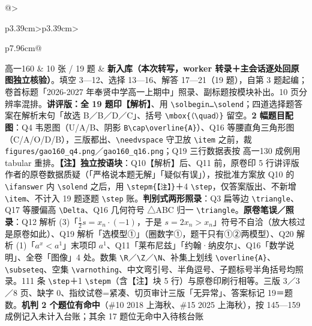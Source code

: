\documentclass[a4paper,11pt]{article}
\begin{document}
\begin{xltabular}{\textwidth}{@{}>{\raggedright\arraybackslash}p{3.39cm}>{\centering\arraybackslash}p{3.39cm}>{\raggedright\arraybackslash}p{7.96cm}@{}}
高一160 & 10 张 / 19 题 & \textbf{新入库（本次转写，worker 转录＋主会话逐处回原图独立核验）}。填空 3---12、选择 13---16、解答 17---21（19 题），自第 3 题起编；卷首标题「2026-2027 年奉贤中学高一上期中」照录、副标题按模块补出。10 页分辨率混排。\textbf{讲评版：全 19 题印【解析】}、用 \texttt{\textbackslash{}solbegin…\textbackslash{}solend}；四道选择题答案在解析末句「故选 B／B／D／C」、括号 \texttt{\textbackslash{}mbox\{（\textbackslash{}quad）\}} 留空。\textbf{2 幅题目配图}：Q4 韦恩图（U/A/B、阴影 \texttt{B\textbackslash{}cap\textbackslash{}overline\{A\}}）、Q16 等腰直角三角形图（C/A/O/D/B），三版都出、\texttt{\textbackslash{}needvspace} 守卫放 \texttt{\textbackslash{}item} 之前，裁 \texttt{figures/\allowbreak{}gao160\_q4.png}／\texttt{gao160\_q16.png}；Q19 三行数据表按 高一130 成例用 tabular 重排。\textbf{【注】独立按语块}：Q10【解析】后、Q11 前，原卷印 5 行讲评版作者的原卷数据质疑（「严格说本题无解」「疑似有误」），按批准方案放 Q10 的 \texttt{\textbackslash{}ifanswer} 内 \texttt{\textbackslash{}solend} 之后，用 \texttt{\textbackslash{}stepm\{【注】\}}＋4 \texttt{\textbackslash{}step}，仅答案版出、不新增 \texttt{\textbackslash{}item}、不计入 19 题逐题 \texttt{\textbackslash{}step} 账。\textbf{判别式两形照录}：Q3 扁等边 \texttt{\textbackslash{}triangle}、Q17 等腰偏高 \texttt{\textbackslash{}Delta}、Q16 几何符号 △ABC 归一 \texttt{\textbackslash{}triangle}。\textbf{原卷笔误／照录}：Q12 解析 (3)「\(\frac12 s=x_n\cdot(-1)\)，于是 \(s=\allowbreak 2x_n>x_n\)」符号不自洽（放大核过是原卷如此）、Q19 解析「选模型①」（圈数字①，题干只有①②两模型）、Q20 解析 (1)「\(a^x<a^1\)」末项印 \(a^1\)、Q11「莱布尼兹」「约翰·纳皮尔」、Q16「数学说明」、全卷「图像」4 处。数集 \texttt{\textbackslash{}R}／\texttt{\textbackslash{}Z}／\texttt{\textbackslash{}N}、补集上划线 \texttt{\textbackslash{}overline\{A\}}、\texttt{\textbackslash{}subseteq}、空集 \texttt{\textbackslash{}varnothing}、中文弯引号、半角逗号、子题标号半角括号均照录。111 条 \texttt{\textbackslash{}step}＋1 \texttt{\textbackslash{}stepm}（含【注】块 5 行）与原卷印刷行相等。三版 3／3／8 页、缺字 0、指纹试卷=紧凑、切页审计三版「无异常」、答案标记 19＝题数。\textbf{机判 2 个题位有命中}（\#10 2018 上海秋、\#15 2025 上海秋），按 145---159 成例记入未计入台账；其余 17 题位无命中入待核台账 \\ \addlinespace[1pt]

\end{xltabular}
\end{document}
